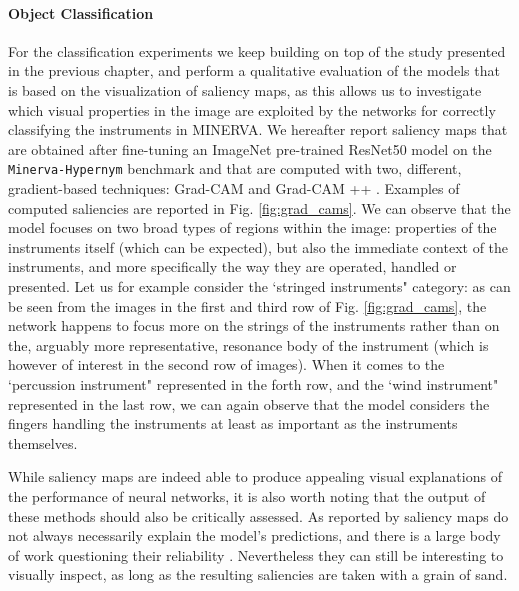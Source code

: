 \paragraph{Object Classification}
For the classification experiments we keep building on top of the study presented in the previous chapter, and perform a qualitative evaluation of the models that is based on the visualization of saliency maps, as this allows us to investigate which visual properties in the image are exploited by the networks for correctly classifying the instruments in MINERVA. We hereafter report saliency maps that are obtained after fine-tuning an ImageNet pre-trained ResNet50 model on the \texttt{Minerva-Hypernym} benchmark and that are computed with two, different, gradient-based techniques: Grad-CAM \cite{selvaraju2017grad} and Grad-CAM ++ \cite{chattopadhay2018grad}. Examples of computed saliencies are reported in Fig. \ref{fig:grad_cams}. We can observe that the model focuses on two broad types of regions within the image: properties of the instruments itself (which can be expected), but also the immediate context of the instruments, and more specifically the way they are operated, handled or presented. Let us for example consider the `stringed instruments" category: as can be seen from the images in the first and third row of Fig. \ref{fig:grad_cams}, the network happens to focus more on the strings of the instruments rather than on the, arguably more representative, resonance body of the instrument (which is however of interest in the second row of images). When it comes to the `percussion instrument" represented in the forth row, and the `wind instrument" represented in the last row, we can again observe that the model considers the fingers handling the instruments at least as important as the instruments themselves.  

While saliency maps are indeed able to produce appealing visual explanations of the performance of neural networks, it is also worth noting that the output of these methods should also be critically assessed. As reported by \citet{alqaraawi2020evaluating} saliency maps do not always necessarily explain the model's predictions, and there is a large body of work questioning their reliability \cite{simonyan2013deep,arun2020assessing,saporta2021deep}. Nevertheless they can still be interesting to visually inspect, as long as the resulting saliencies are taken with a grain of sand. 

